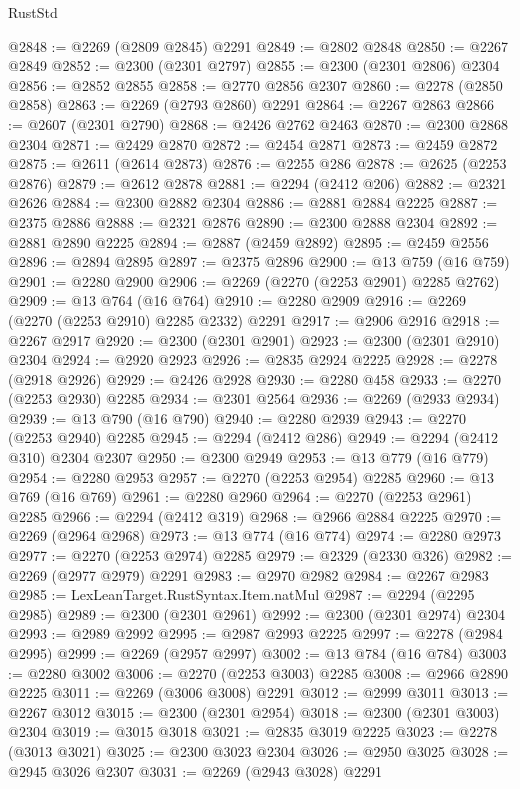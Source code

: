 \begin{lexlean}{RustStd}
\begin{coremodule}
@2848 := @2269 (@2809 @2845) @2291
@2849 := @2802 @2848
@2850 := @2267 @2849
@2852 := @2300 (@2301 @2797)
@2855 := @2300 (@2301 @2806) @2304
@2856 := @2852 @2855
@2858 := @2770 @2856 @2307
@2860 := @2278 (@2850 @2858)
@2863 := @2269 (@2793 @2860) @2291
@2864 := @2267 @2863
@2866 := @2607 (@2301 @2790)
@2868 := @2426 @2762 @2463
@2870 := @2300 @2868 @2304
@2871 := @2429 @2870
@2872 := @2454 @2871
@2873 := @2459 @2872
@2875 := @2611 (@2614 @2873)
@2876 := @2255 @286
@2878 := @2625 (@2253 @2876)
@2879 := @2612 @2878
@2881 := @2294 (@2412 @206)
@2882 := @2321 @2626
@2884 := @2300 @2882 @2304
@2886 := @2881 @2884 @2225
@2887 := @2375 @2886
@2888 := @2321 @2876
@2890 := @2300 @2888 @2304
@2892 := @2881 @2890 @2225
@2894 := @2887 (@2459 @2892)
@2895 := @2459 @2556
@2896 := @2894 @2895
@2897 := @2375 @2896
@2900 := @13 @759 (@16 @759)
@2901 := @2280 @2900
@2906 := @2269 (@2270 (@2253 @2901) @2285 @2762)
@2909 := @13 @764 (@16 @764)
@2910 := @2280 @2909
@2916 := @2269 (@2270 (@2253 @2910) @2285 @2332) @2291
@2917 := @2906 @2916
@2918 := @2267 @2917
@2920 := @2300 (@2301 @2901)
@2923 := @2300 (@2301 @2910) @2304
@2924 := @2920 @2923
@2926 := @2835 @2924 @2225
@2928 := @2278 (@2918 @2926)
@2929 := @2426 @2928
@2930 := @2280 @458
@2933 := @2270 (@2253 @2930) @2285
@2934 := @2301 @2564
@2936 := @2269 (@2933 @2934)
@2939 := @13 @790 (@16 @790)
@2940 := @2280 @2939
@2943 := @2270 (@2253 @2940) @2285
@2945 := @2294 (@2412 @286)
@2949 := @2294 (@2412 @310) @2304 @2307
@2950 := @2300 @2949
@2953 := @13 @779 (@16 @779)
@2954 := @2280 @2953
@2957 := @2270 (@2253 @2954) @2285
@2960 := @13 @769 (@16 @769)
@2961 := @2280 @2960
@2964 := @2270 (@2253 @2961) @2285
@2966 := @2294 (@2412 @319)
@2968 := @2966 @2884 @2225
@2970 := @2269 (@2964 @2968)
@2973 := @13 @774 (@16 @774)
@2974 := @2280 @2973
@2977 := @2270 (@2253 @2974) @2285
@2979 := @2329 (@2330 @326)
@2982 := @2269 (@2977 @2979) @2291
@2983 := @2970 @2982
@2984 := @2267 @2983
@2985 := LexLeanTarget.RustSyntax.Item.natMul
@2987 := @2294 (@2295 @2985)
@2989 := @2300 (@2301 @2961)
@2992 := @2300 (@2301 @2974) @2304
@2993 := @2989 @2992
@2995 := @2987 @2993 @2225
@2997 := @2278 (@2984 @2995)
@2999 := @2269 (@2957 @2997)
@3002 := @13 @784 (@16 @784)
@3003 := @2280 @3002
@3006 := @2270 (@2253 @3003) @2285
@3008 := @2966 @2890 @2225
@3011 := @2269 (@3006 @3008) @2291
@3012 := @2999 @3011
@3013 := @2267 @3012
@3015 := @2300 (@2301 @2954)
@3018 := @2300 (@2301 @3003) @2304
@3019 := @3015 @3018
@3021 := @2835 @3019 @2225
@3023 := @2278 (@3013 @3021)
@3025 := @2300 @3023 @2304
@3026 := @2950 @3025
@3028 := @2945 @3026 @2307
@3031 := @2269 (@2943 @3028) @2291

\end{coremodule}
\end{lexlean}
